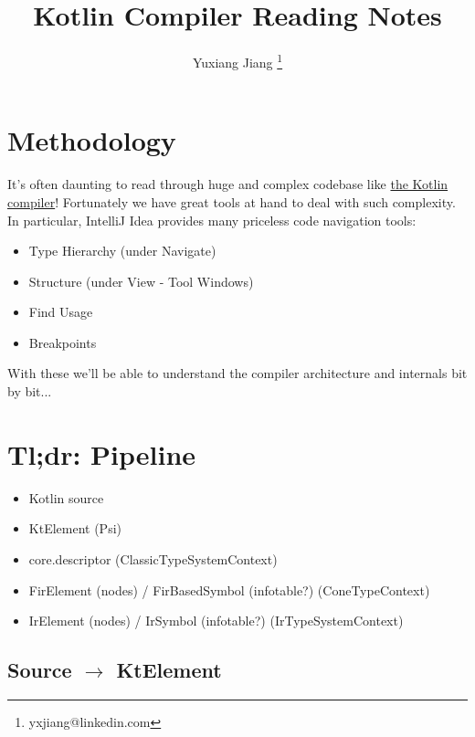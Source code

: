 \documentclass{article}
\begin{document}
\title{Kotlin Compiler Reading Notes}
\author{Yuxiang Jiang \thanks{yxjiang@linkedin.com}}
\maketitle

\newcommand{\textSafeTo}{\texorpdfstring{$\to$}{to} }

\tableofcontents

\section{Methodology}
It's often daunting to read through huge and complex codebase like \href{https://github.com/JetBrains/kotlin}{the Kotlin compiler}! Fortunately we have great tools at hand to deal with such complexity. In particular, IntelliJ Idea provides many priceless code navigation tools:
\begin{itemize}
    \item Type Hierarchy (under Navigate)
    \item Structure (under View - Tool Windows)
    \item Find Usage
    \item Breakpoints
\end{itemize}

With these we'll be able to understand the compiler architecture and internals bit by bit...

\section{Tl;dr: Pipeline}
\begin{itemize}
    \item Kotlin source
    \item KtElement (Psi)
    \item core.descriptor (ClassicTypeSystemContext)
    \item FirElement (nodes) / FirBasedSymbol (infotable?) (ConeTypeContext)
    \item IrElement (nodes) / IrSymbol (infotable?) (IrTypeSystemContext)
\end{itemize}

\subsection{Source \textSafeTo KtElement}
\end{document}
